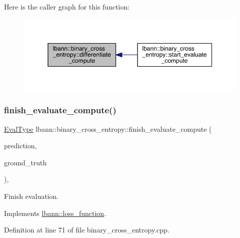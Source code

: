 Here is the caller graph for this function\+:\nopagebreak
\begin{figure}[H]
\begin{center}
\leavevmode
\includegraphics[width=350pt]{classlbann_1_1binary__cross__entropy_aeb1d10100a565e1c92a4f75fb7f58829_icgraph}
\end{center}
\end{figure}
\mbox{\label{classlbann_1_1binary__cross__entropy_acedb440a94926866c4de4fdeeb5165bd}} 
\subsubsection{\texorpdfstring{finish\+\_\+evaluate\+\_\+compute()}{finish\_evaluate\_compute()}}
{\footnotesize\ttfamily \hyperlink{base_8hpp_a3266f5ac18504bbadea983c109566867}{Eval\+Type} lbann\+::binary\+\_\+cross\+\_\+entropy\+::finish\+\_\+evaluate\+\_\+compute (\begin{DoxyParamCaption}\item[{const \hyperlink{base_8hpp_a9a697a504ae84010e7439ffec862b470}{Abs\+Dist\+Mat} \&}]{prediction,  }\item[{const \hyperlink{base_8hpp_a9a697a504ae84010e7439ffec862b470}{Abs\+Dist\+Mat} \&}]{ground\+\_\+truth }\end{DoxyParamCaption})\hspace{0.3cm}{\ttfamily [override]}, {\ttfamily [virtual]}}

Finish evaluation. 

Implements \hyperlink{classlbann_1_1loss__function_a3ea8553a4e9c75477d7d4fc533c4d4fd}{lbann\+::loss\+\_\+function}.



Definition at line 71 of file binary\+\_\+cross\+\_\+entropy.\+cpp.


